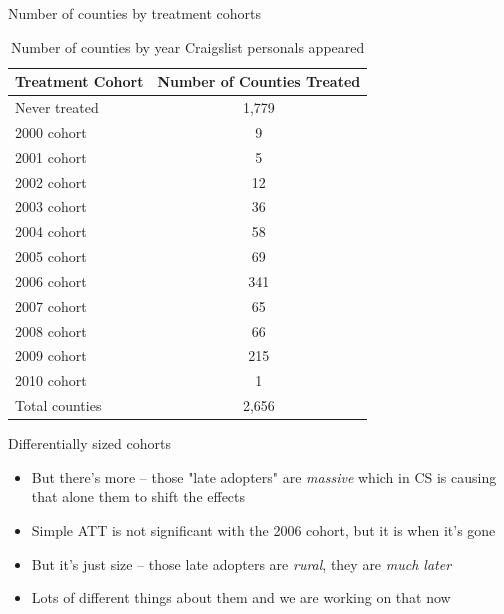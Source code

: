 \documentclass{beamer}
\begin{document}
\begin{frame}[shrink=20]{Number of counties by treatment cohorts}
\begin{table}[htbp]\centering
\caption{Number of counties by year Craigslist personals appeared}
\begin{tabular}{lc}
\toprule
\textbf{Treatment Cohort} & \textbf{Number of Counties Treated} \\
\midrule
Never treated&       1,779\\
2000 cohort &           9\\
2001 cohort &           5\\
2002 cohort &          12\\
2003 cohort &          36\\
2004 cohort &          58\\
2005 cohort &          69\\
2006 cohort &         341\\
2007 cohort &          65\\
2008 cohort &          66\\
2009 cohort &         215\\
2010 cohort &           1\\
\midrule
Total counties &     2,656 \\
\bottomrule
\end{tabular}
\end{table}
\end{frame}

\begin{frame}{Differentially sized cohorts}

\begin{itemize}
\item But there's more -- those "late adopters" are \emph{massive} which in CS is causing that alone them to shift the effects
\item Simple ATT is not significant with the 2006 cohort, but it is when it's gone
\item But it's just size -- those late adopters are \emph{rural}, they are \emph{much later}
\item Lots of different things about them and we are working on that now
\end{itemize}

\end{frame}
\end{document}
